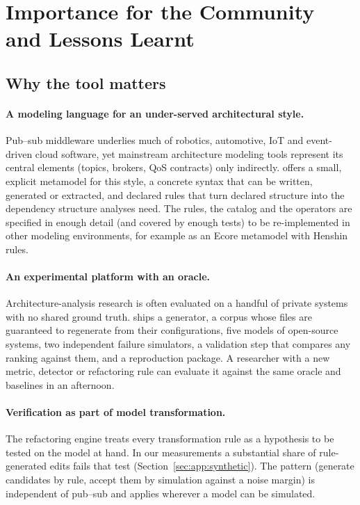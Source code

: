 \section{Importance for the Community and Lessons Learnt}
\label{sec:lessons}

\subsection{Why the tool matters}
\label{sec:lessons:importance}

\paragraph{A modeling language for an under-served architectural style.} Pub--sub middleware underlies much of robotics, automotive, IoT and event-driven cloud software, yet mainstream architecture modeling tools represent its central elements (topics, brokers, QoS contracts) only indirectly. \sag{} offers a small, explicit metamodel for this style, a concrete syntax that can be written, generated or extracted, and declared rules that turn declared structure into the dependency structure analyses need. The rules, the catalog and the operators are specified in enough detail (and covered by enough tests) to be re-implemented in other modeling environments, for example as an Ecore metamodel with Henshin rules.

\paragraph{An experimental platform with an oracle.} Architecture-analysis research is often evaluated on a handful of private systems with no shared ground truth. \sag{} ships a generator, a corpus whose files are guaranteed to regenerate from their configurations, five models of open-source systems, two independent failure simulators, a validation step that compares any ranking against them, and a reproduction package. A researcher with a new metric, detector or refactoring rule can evaluate it against the same oracle and baselines in an afternoon.

\paragraph{Verification as part of model transformation.} The refactoring engine treats every transformation rule as a hypothesis to be tested on the model at hand. In our measurements a substantial share of rule-generated edits fails that test (Section~\ref{sec:app:synthetic}). The pattern (generate candidates by rule, accept them by simulation against a noise margin) is independent of pub--sub and applies wherever a model can be simulated.

